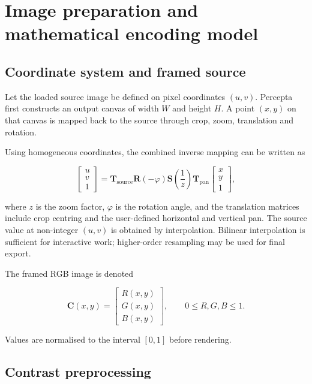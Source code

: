 \section{Image preparation and mathematical encoding model}

\subsection{Coordinate system and framed source}

Let the loaded source image be defined on pixel coordinates $(u,v)$. Percepta first constructs an output canvas of width $W$ and height $H$. A point $(x,y)$ on that canvas is mapped back to the source through crop, zoom, translation and rotation.

Using homogeneous coordinates, the combined inverse mapping can be written as

\begin{equation}
\begin{bmatrix}
u\\v\\1\end{bmatrix}
=
\mathbf{T}_{\mathrm{source}}
\mathbf{R}(-\varphi)
\mathbf{S}\!\left(\frac{1}{z}\right)
\mathbf{T}_{\mathrm{pan}}
\begin{bmatrix}x\\y\\1\end{bmatrix},
\label{eq:framing}
\end{equation}

where $z$ is the zoom factor, $\varphi$ is the rotation angle, and the translation matrices include crop centring and the user-defined horizontal and vertical pan. The source value at non-integer $(u,v)$ is obtained by interpolation. Bilinear interpolation is sufficient for interactive work; higher-order resampling may be used for final export.

The framed RGB image is denoted

\begin{equation}
\mathbf{C}(x,y)=
\begin{bmatrix}
R(x,y)\\[1mm]G(x,y)\\[1mm]B(x,y)
\end{bmatrix},
\qquad 0\le R,G,B\le 1.
\end{equation}

Values are normalised to the interval $[0,1]$ before rendering.

\subsection{Contrast preprocessing}

